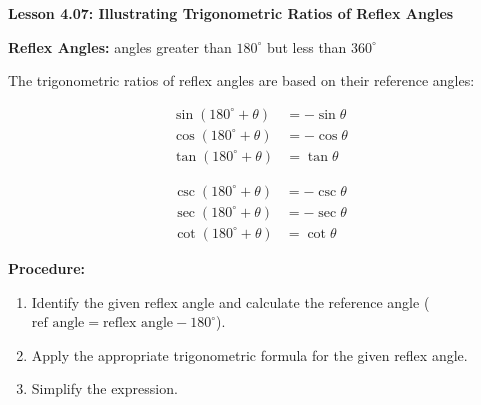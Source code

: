 \begin{center}
\textbf{Lesson 4.07: Illustrating Trigonometric Ratios of Reflex Angles}
\end{center}

\vspace*{-1.5ex}

\noindent \textbf{Reflex Angles:} angles greater than \(180^\circ\) but less than \(360^\circ\)

\noindent  The trigonometric ratios of reflex angles are based on their reference angles:

\vspace*{-1em}

\begin{minipage}[c]{0.48\textwidth}
\begin{align*}
        \sin(180^\circ + \theta) &= -\sin \theta \\
        \cos(180^\circ + \theta) &= -\cos \theta \\
        \tan(180^\circ + \theta) &= \tan \theta 
\end{align*}
\end{minipage}
\begin{minipage}[c]{0.48\textwidth}
\begin{align*}
         \csc(180^\circ + \theta) &= -\csc \theta \\
        \sec(180^\circ + \theta) &= -\sec \theta \\
        \cot(180^\circ + \theta) &= \cot \theta
    \end{align*}
\end{minipage}

 \noindent     \textbf{Procedure:}
    \begin{enumerate}
        \item Identify the given reflex angle and calculate the reference angle (\( \text{ref angle} = \text{reflex angle} - 180^\circ \)).
        \item Apply the appropriate trigonometric formula for the given reflex angle.
        \item Simplify the expression.
    \end{enumerate}
